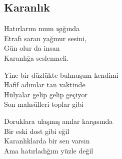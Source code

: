 \subsection{Karanlık}

Hatırlarım mum ışığında \\
Etrafı saran yağmur sesini, \\
Gün olur da insan \\
Karanlığa seslenmeli.

\noindent\newline
Yine bir düzlükte bulmuşum kendimi \\
Hafif adımlar tan vaktinde \\
Hülyalar gelip gelip geçiyor \\
Son mahsülleri toplar gibi

\noindent\newline
Doruklara ulaşmış anılar karşısında \\
Bir eski dost gibi eğil \\
Karanlıklarda bir sen varsın \\
Ama hatırladığım yüzle değil